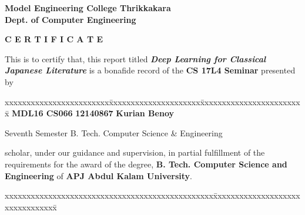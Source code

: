 \documentclass[12pt]{report}
\begin{document}
\begin{titlepage}
\begin{center}
\Large{\textbf{Model Engineering College Thrikkakara}}\\
\Large{\textbf{Dept. of Computer Engineering}}\\
\end{center}
\begin{figure}[h]
\begin{center}
\end{center}
\end{figure}
\begin{center}
\Large{\textbf{C E R T I F I C A T E}}\\
\vspace{.1in}
\end{center}
This is to certify that, this report titled \textbf{\textit{ Deep Learning for Classical Japanese Literature}} is a bonafide record of the \textbf{CS 17L4 Seminar} presented by 
\begin{center}
 \begin{tabbing}
   xxxxxxxxxxxxxxxxxxxxxxxx\=xxxxxxxxxxxxxxxxxxxxx\= xxxxxxxxxxxxxxxxxxxxxxxx\=\kill
\Large{\textbf{MDL16 CS066 }}	\>\Large{\textbf{12140867}}	\>\Large{\textbf{Kurian Benoy}}\\ 
\end{tabbing} 
\end{center}
\begin{center}

Seventh Semester B. Tech. 
Computer Science \& Engineering  \end{center} scholar, under our guidance and supervision, in partial 
 fulfillment of the requirements for the award of the degree,\textbf{ B. Tech. Computer 
Science  and Engineering} of \textbf{APJ Abdul Kalam University}.
\vspace{.2in}
\begin{tabbing}
xxxxxxxxxxxxxxxxxxxxxxxxxxxxxxxxxxxxxxxxxxxxxxxx\= xxxxxxxxxxxxxxxxxxxxxxxxxxxxxxxx\= \kill


\end{tabbing}
\end{titlepage}
\end{document}
